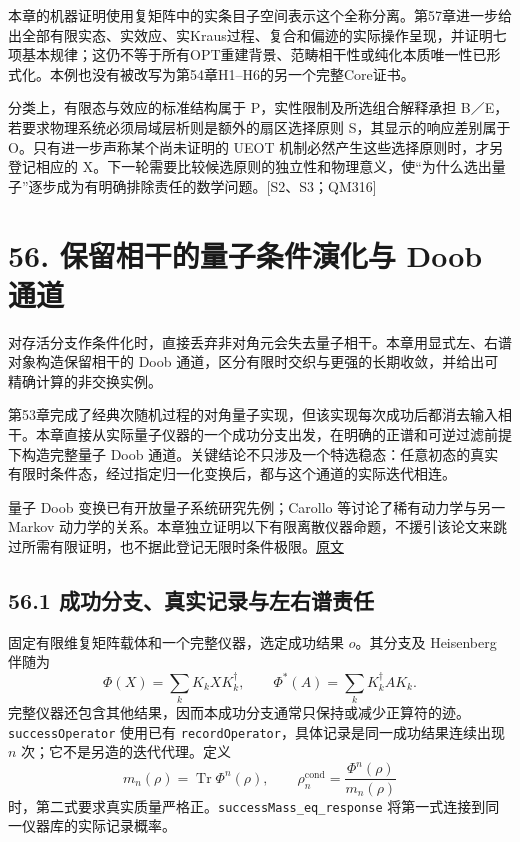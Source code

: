 \documentclass[
  11pt,
  oneside]{book}
\begin{document}
本章的机器证明使用复矩阵中的实条目子空间表示这个全称分离。第57章进一步给出全部有限实态、实效应、实Kraus过程、复合和偏迹的实际操作呈现，并证明七项基本规律；这仍不等于所有OPT重建背景、范畴相干性或纯化本质唯一性已形式化。本例也没有被改写为第54章H1--H6的另一个完整Core证书。

分类上，有限态与效应的标准结构属于 P，实性限制及所选组合解释承担
B／E，若要求物理系统必须局域层析则是额外的扇区选择原则
S，其显示的响应差别属于 O。只有进一步声称某个尚未证明的 UEOT
机制必然产生这些选择原则时，才另登记相应的
X。下一轮需要比较候选原则的独立性和物理意义，使``为什么选出量子''逐步成为有明确排除责任的数学问题。{[}S2、S3；QM316{]}

\chapter{56. 保留相干的量子条件演化与 Doob 通道}\label{ch-56}\hypertarget{ch-56}{}

对存活分支作条件化时，直接丢弃非对角元会失去量子相干。本章用显式左、右谱对象构造保留相干的
Doob
通道，区分有限时交织与更强的长期收敛，并给出可精确计算的非交换实例。

第53章完成了经典次随机过程的对角量子实现，但该实现每次成功后都消去输入相干。本章直接从实际量子仪器的一个成功分支出发，在明确的正谱和可逆过滤前提下构造完整量子
Doob
通道。关键结论不只涉及一个特选稳态：任意初态的真实有限时条件态，经过指定归一化变换后，都与这个通道的实际迭代相连。

量子 Doob 变换已有开放量子系统研究先例；Carollo 等讨论了稀有动力学与另一
Markov
动力学的关系。本章独立证明以下有限离散仪器命题，不援引该论文来跳过所需有限证明，也不据此登记无限时条件极限。\href{https://arxiv.org/abs/1711.10951}{原文}

\section{56.1 成功分支、真实记录与左右谱责任}

固定有限维复矩阵载体和一个完整仪器，选定成功结果 \(o\)。其分支及
Heisenberg 伴随为 \[
\Phi(X)=\sum_kK_kXK_k^\dagger,
\qquad \Phi^*(A)=\sum_kK_k^\dagger AK_k.
\]
完整仪器还包含其他结果，因而本成功分支通常只保持或减少正算符的迹。\texttt{success\allowbreak Operator}
使用已有 \texttt{record\allowbreak Operator}，具体记录是同一成功结果连续出现 \(n\)
次；它不是另造的迭代代理。定义 \[
m_n(\rho)=\operatorname{Tr}\Phi^n(\rho),\qquad
\rho_n^{\mathrm{cond}}=\frac{\Phi^n(\rho)}{m_n(\rho)}
\] 时，第二式要求真实质量严格正。\texttt{success\allowbreak Mass\_\allowbreak eq\_\allowbreak response}
将第一式连接到同一仪器库的实际记录概率。
\end{document}
